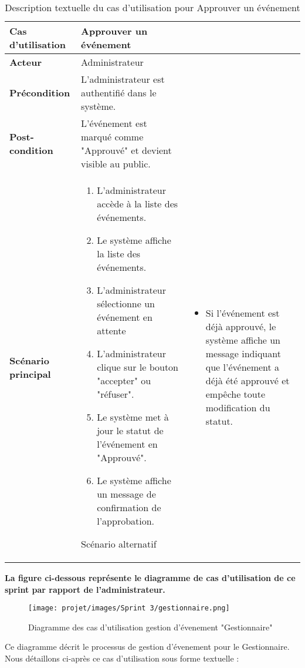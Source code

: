 \begin{longtable}{|>{\bfseries}p{4cm}|p{10cm}|}
\hline
Cas d’utilisation & Approuver un événement \\
\hline
Acteur & Administrateur \\
\hline
Précondition & L’administrateur est authentifié dans le système. \\
\hline
Post-condition & L’événement est marqué comme "Approuvé" et devient visible au public. \\
\hline
Scénario principal & 
\begin{enumerate}
  \item L’administrateur accède à la liste des événements.
  \item Le système affiche la liste des événements.
  \item L’administrateur sélectionne un événement en attente
 
  \item L’administrateur clique sur le bouton "accepter" ou "réfuser".
  \item Le système met à jour le statut de l’événement en "Approuvé".
  \item Le système affiche un message de confirmation de l’approbation.
\end{enumerate} 
\hline
Scénario alternatif & 
\begin{itemize}
  \item Si l’événement est déjà approuvé, le système affiche un message indiquant que l’événement a déjà été approuvé et empêche toute modification du statut.
\end{itemize} 
\hline
\caption{Description textuelle du cas d’utilisation pour Approuver un événement}
\end{longtable}
\textbf {La figure ci-dessous représente le diagramme de cas d’utilisation de ce sprint par rapport de l'administrateur.}
\begin{figure}[H]
    \centering
    \texttt{[image: projet/images/Sprint 3/gestionnaire.png]}
    \caption{Diagramme des cas d’utilisation gestion d'évenement "Gestionnaire" }
    \label{fig:Adminee }
\end{figure}
Ce diagramme décrit le processus de gestion d'évenement pour le Gestionnaire. Nous détaillons ci-après ce cas d’utilisation sous forme textuelle :

